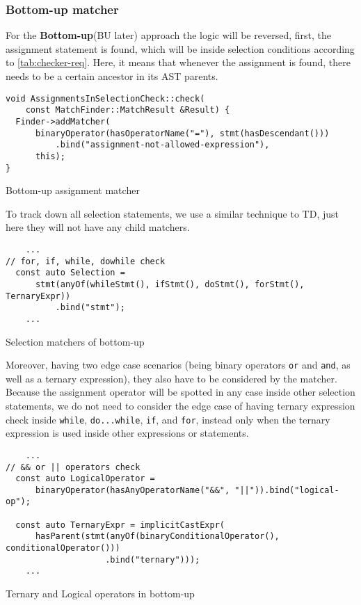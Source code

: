 \subsubsection{Bottom-up matcher}
For the \textbf{Bottom-up}(BU later) approach the logic will be reversed, first, the assignment statement is found, which will be inside selection conditions according to \ref{tab:checker-req}. Here, it means that whenever the assignment is found, there needs to be a certain ancestor in its AST parents. 


\begin{listing}[H]
\begin{verbatim}
void AssignmentsInSelectionCheck::check(
    const MatchFinder::MatchResult &Result) {
  Finder->addMatcher(
      binaryOperator(hasOperatorName("="), stmt(hasDescendant()))
          .bind("assignment-not-allowed-expression"),
      this);
}
\end{verbatim}
\caption{Bottom-up assignment matcher}
\end{listing}

To track down all selection statements, we use a similar technique to TD, just here they will not have any child matchers. 

\begin{listing}[H]
\begin{verbatim}
    ...
// for, if, while, dowhile check
  const auto Selection =
      stmt(anyOf(whileStmt(), ifStmt(), doStmt(), forStmt(), TernaryExpr))
          .bind("stmt");
    ...
\end{verbatim}
\caption{Selection matchers of bottom-up}
\end{listing}

Moreover, having two edge case scenarios (being binary operators \lstinline{or} and \lstinline{and}, as well as a ternary expression), they also have to be considered by the matcher. Because the assignment operator will be spotted in any case inside other selection statements, we do not need to consider the edge case of having ternary expression check inside \lstinline{while}, \lstinline{do...while}, \lstinline{if}, and \lstinline{for}, instead only when the ternary expression is used inside other expressions or statements. 

\begin{listing}[H]
\begin{verbatim}
    ...
// && or || operators check
  const auto LogicalOperator =
      binaryOperator(hasAnyOperatorName("&&", "||")).bind("logical-op");

  const auto TernaryExpr = implicitCastExpr(
      hasParent(stmt(anyOf(binaryConditionalOperator(), conditionalOperator()))
                    .bind("ternary")));
    ...
\end{verbatim}
\caption{Ternary and Logical operators in bottom-up}
\end{listing}

